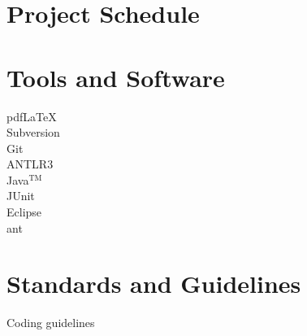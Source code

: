 \chapter{Project Schedule}
\begin{landscape}
  \begin{gantt}{12}{16}
    \begin{ganttitle}
    \end{ganttitle}
  \end{gantt}
\end{landscape}

\chapter{Tools and Software}
\begin{description}
  \item[pdf\LaTeX] 
  \item[Subversion]
  \item[Git]
  \item[ANTLR3]
  \item[Java$^{\textrm{TM}}$]
  \item[JUnit]
  \item[Eclipse]
  \item[ant]
\end{description}

\chapter{Standards and Guidelines}
Coding guidelines


